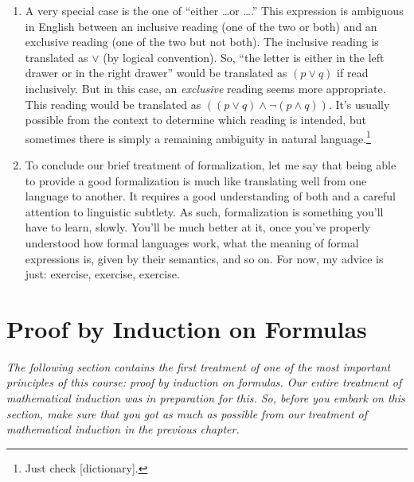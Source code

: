 \begin{enumerate}[\thesection.1]
	\item A very special case is the one of ``either \dots or \dots.'' This expression is ambiguous in English between an inclusive reading (one of the two or both) and an exclusive reading (one of the two but not both). The inclusive reading is translated as $\lor$ (by logical convention). So, ``the letter is either in the left drawer or in the right drawer'' would be translated as $(p\lor q)$ if read inclusively. But in this case, an \emph{exclusive} reading seems more appropriate. This reading would be translated as $((p\lor q)\land \neg (p\land q))$. It's usually possible from the context to determine which reading is intended, but sometimes there is simply a remaining ambiguity in natural language.\footnote{Just check [dictionary].}
	
	\item To conclude our brief treatment of formalization, let me say that being able to provide a good formalization is much like translating well from one language to another. It requires a good understanding of both and a careful attention to linguistic subtlety. As such, formalization is something you'll have to learn, slowly. You'll be much better at it, once you've properly understood how formal languages work, what the meaning of formal expressions is, given by their semantics, and so on. For now, my advice is just: exercise, exercise, exercise.

	\end{enumerate}
	
\section{Proof by Induction on Formulas}

\emph{The following section contains the first treatment of one of the most important principles of this course: proof by induction on formulas. Our entire treatment of mathematical induction was in preparation for this. So, before you embark on this section, make sure that you got as much as possible from our treatment of mathematical induction in the previous chapter.}

